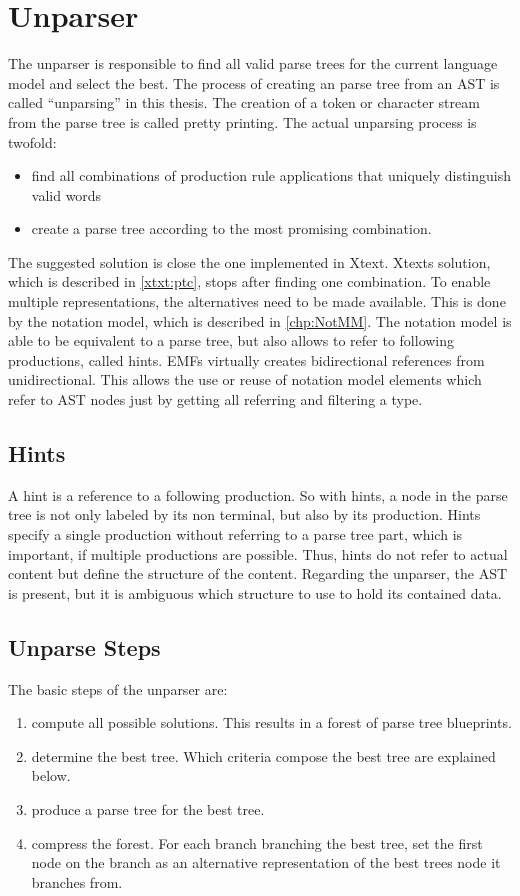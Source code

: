 \chapter{Unparser}
The unparser is responsible to find all valid parse trees for the current language model and select the best. The process of creating an parse tree from an AST is called ``unparsing'' in this thesis. The creation of a token or character stream from the parse tree is called pretty printing. The actual unparsing process is twofold:
\begin{itemize}
	\item find all combinations of production rule applications that uniquely distinguish valid words
	\item create a parse tree according to the most promising combination. 
\end{itemize}
 
The suggested solution is close the one implemented in Xtext. Xtexts solution, which is described in \ref{xtxt:ptc}, stops after finding one combination. 
To enable multiple representations, the alternatives need to be made available. This is done by the notation model, which is described in \ref{chp:NotMM}. The notation model is able to be equivalent to a parse tree, but also allows to refer to following productions, called hints. EMFs  virtually creates bidirectional references from unidirectional. This allows the use or reuse of notation model elements which refer to AST nodes just by getting all referring  and filtering a type.


\section{Hints}
A hint is a reference to a following production. So with hints, a node in the parse tree is not only labeled by its non terminal, but also by its production. Hints specify a single production without referring to a parse tree part, which is important, if multiple productions are possible. Thus, hints do not refer to actual content but define the structure of the content. Regarding the unparser, the AST is present, but it is ambiguous which structure to use to hold its contained data.  

\section{Unparse Steps}
The basic steps of the unparser are:
\begin{enumerate}
	\item compute all possible solutions. This results in a forest of parse tree blueprints.
	\item determine the best tree. Which criteria compose the best tree are explained below.
	\item produce a parse tree for the best tree. 
	\item compress the forest. For each branch branching the best tree, set the first node on the branch as an alternative representation of the best trees node it branches from.
\end{enumerate}

